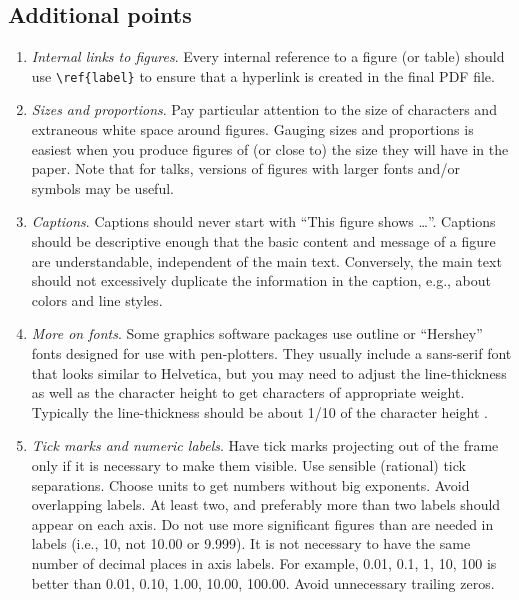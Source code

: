 \documentclass[letterpaper,11pt]{article}
\begin{document}
\subsection{Additional points}

\begin{enumerate}

\item {\it Internal links to figures\/}.  Every internal reference to a figure (or table) should use
\verb|\ref{label}| to ensure that a hyperlink is created in the final PDF file.

\item {\it Sizes and proportions\/}. Pay particular attention to the size of characters and
extraneous white space around figures.  Gauging sizes and proportions is easiest when you produce figures of (or close to) the size they will have in the paper.  Note that for talks, versions of figures with larger fonts and/or symbols may be useful.

\item {\it Captions\/}.  Captions should never start with ``This figure shows \dots''.  Captions should be descriptive enough that the basic content and message of a figure are understandable, independent of the main text.  Conversely, the main text should not excessively duplicate the information in the caption, e.g., about colors and line styles.

\item {\it More on fonts\/}.  Some graphics software packages use outline or
``Hershey'' fonts designed for use with pen-plotters.  They usually include a
sans-serif font that looks similar to Helvetica, but you may need to adjust
the line-thickness as well as the character height to get characters of
appropriate weight.  Typically the line-thickness should be about 1/10 of the
character height  .

\item {\it Tick marks and numeric labels\/}. Have tick marks projecting out of
the frame only if it is necessary to make them visible.  Use sensible
(rational) tick separations.  Choose units to get numbers without big
exponents.  Avoid overlapping labels.  At least two, and preferably more than
two labels should appear on each axis.  Do not use more significant figures
than are needed in labels (i.e., 10, not 10.00 or 9.999).  It is not necessary
to have the same number of decimal places in axis labels.  For example,
0.01, 0.1, 1, 10, 100 is better than 0.01, 0.10, 1.00, 10.00, 100.00.
Avoid unnecessary trailing zeros.


\end{enumerate}
\end{document}
